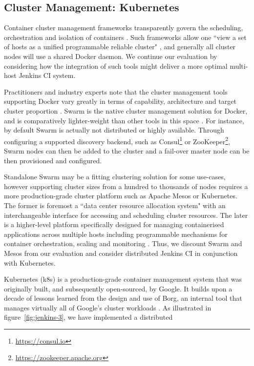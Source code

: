 \documentclass[journal]{IEEEtran}
\begin{document}
\subsection{Cluster Management: Kubernetes}
Container cluster management frameworks transparently govern the
scheduling, orchestration and isolation of containers \citep{Rensin}. 
Such frameworks allow one ``view a set of hosts as a 
unified programmable reliable cluster" \citep{goasguen}, and generally all cluster nodes
will use a shared Docker daemon. We continue our evaluation by
considering how the integration of such tools might deliver a more optimal multi-host
Jenkins CI system.
\par
Practitioners and industry experts note that the cluster management tools supporting Docker
vary greatly in terms of capability, architecture and target cluster proportion
\citep{goasguen, holla}. Swarm is the native cluster management solution for 
Docker, and is comparatively lighter-weight than other tools in this space \citep{holla}.
For instance, by default Swarm is actually not distributed or highly available. 
Through configuring a supported discovery backend, such
as Consul\footnote{\href{https://www.consul.io}{https://consul.io}}
or ZooKeeper\footnote{\href{https://zookeeper.apache.org}{https://zookeeper.apache.org}}, Swarm nodes can then be added to 
the cluster and a fail-over master node can be then provisioned and configured.
\par
Standalone Swarm may be a fitting clustering solution for some use-cases, however supporting
cluster sizes from a hundred to thousands of nodes requires a more production-grade 
cluster platform such as Apache Mesos or Kubernetes. 
The former is foremost a ``data center resource allocation system" with an 
interchangeable interface for accessing and scheduling cluster resources. 
The later is a higher-level platform specifically 
designed for managing containerised applications across multiple hosts including programmable mechanisms for container orchestration, scaling and monitoring  \citep{goasguen}.
Thus, we discount Swarm and Mesos from our evaluation and consider distributed
Jenkins CI in conjunction with Kubernetes. 
\par
Kubernetes (k8s) is a production-grade container management 
system that was originally built, and subsequently open-sourced, by Google.
It builds upon a decade of lessons learned from the design and use of Borg, 
an internal tool that manages virtually all of Google's cluster workloads \citep{Rensin}.
As illustrated in figure~\ref{fig:jenkins-3}, we have implemented a distributed
\end{document}
